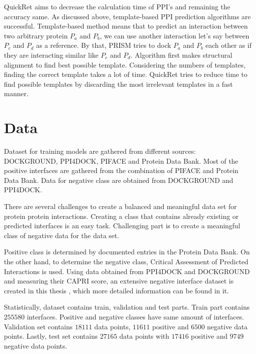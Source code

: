 \documentclass{article}
\begin{document}
QuickRet aims to decrease the calculation time of PPI's and remaining the accuracy same. As discussed above, template-based PPI prediction algorithms are successful. Template-based method means that to predict an interaction between two arbitrary protein $P_a$ and $P_b$, we can use another interaction let's say between $P_c$ and $P_d$ as a reference. By that, PRISM tries to dock $P_a$ and $P_b$ each other as if they are interacting similar like $P_c$ and $P_d$. Algorithm first makes structural alignment to find best possible template\citep{shatsky2004method}. Considering the numbers of templates, finding the correct template takes a lot of time. QuickRet tries to reduce time to find possible templates by discarding the most irrelevant templates in a fast manner.

\section{Data}
Dataset for training models are gathered from different sources: DOCKGROUND\citep{doi:10.1002/pro.3295}, PPI4DOCK\citep{10.1093/bioinformatics/btw533}, PIFACE\citep{RN5} and Protein Data Bank\citep{10.1093/nar/gky1004}. Most of the positive interfaces are gathered from the combination of PIFACE and Protein Data Bank. Data for negative class are obtained from DOCKGROUND and PPI4DOCK.

There are several challenges to create a balanced and meaningful data set for protein protein interactions. Creating a class that contains already existing or predicted interfaces is an easy task. Challenging part is to create a meaningful class of negative data for the data set.

Positive class is determined by documented entries in the Protein Data Bank. On the other hand, to determine the negative class, Critical Assessment of Predicted Interactions\citep{janin2003capri} is used. Using data obtained from PPI4DOCK and DOCKGROUND and measuring their CAPRI score, an extensive negative interface dataset is created in this thesis \citep{balci2018fast}, which more detailed information can be found in it.

Statistically, dataset contains train, validation and test parts. Train part contains $255580$ interfaces. Positive and negative classes have same amount of interfaces. Validation set contains $18111$ data points, $11611$ positive and $6500$ negative data points. Lastly, test set contains $27165$ data points with $17416$ positive and $9749$ negative data points.
\end{document}
